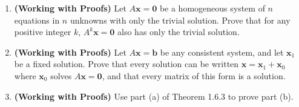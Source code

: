 \documentclass{article}
\theoremstyle{mystyle}
\begin{document}
\begin{enumerate}
    \item[21.] \textbf{(Working with Proofs)} Let $A\mathbf{x}=\mathbf{0}$ be a homogeneous system of $n$ equations in $n$ unknowns with only the trivial solution. Prove that for any positive integer $k$, $A^k\mathbf{x}=\mathbf{0}$ also has only the trivial solution.

    \item[23.] \textbf{(Working with Proofs)} Let $A\mathbf{x}=\mathbf{b}$ be any consistent system, and let $\mathbf{x}_1$ be a fixed solution. Prove that every solution can be written $\mathbf{x}=\mathbf{x}_1+\mathbf{x}_0$ where $\mathbf{x}_0$ solves $A\mathbf{x}=\mathbf{0}$, and that every matrix of this form is a solution.

    \item[24.] \textbf{(Working with Proofs)} Use part (a) of Theorem 1.6.3 to prove part (b).
\end{enumerate}
\end{document}
